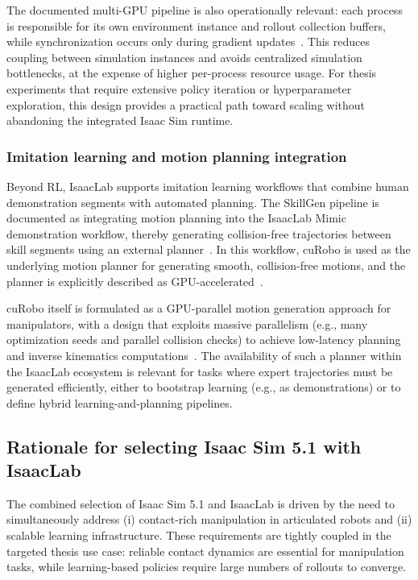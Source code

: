 The documented multi-\ac{GPU} pipeline is also operationally relevant: each process is responsible for its own environment instance and rollout collection buffers, while synchronization occurs only during gradient updates~\cite{isaaclab_multi_gpu_multinode}. This reduces coupling between simulation instances and avoids centralized simulation bottlenecks, at the expense of higher per-process resource usage. For thesis experiments that require extensive policy iteration or hyperparameter exploration, this design provides a practical path toward scaling without abandoning the integrated Isaac Sim runtime.

\subsubsection{Imitation learning and motion planning integration}
Beyond \ac{RL}, IsaacLab supports imitation learning workflows that combine human demonstration segments with automated planning. The SkillGen pipeline is documented as integrating motion planning into the IsaacLab Mimic demonstration workflow, thereby generating collision-free trajectories between skill segments using an external planner~\cite{isaaclab_skillgen}. In this workflow, cuRobo is used as the underlying motion planner for generating smooth, collision-free motions, and the planner is explicitly described as GPU-accelerated~\cite{isaaclab_skillgen}.

cuRobo itself is formulated as a GPU-parallel motion generation approach for manipulators, with a design that exploits massive parallelism (e.g., many optimization seeds and parallel collision checks) to achieve low-latency planning and inverse kinematics computations~\cite{Sundaralingam2023cuRobo}. The availability of such a planner within the IsaacLab ecosystem is relevant for tasks where expert trajectories must be generated efficiently, either to bootstrap learning (e.g., as demonstrations) or to define hybrid learning-and-planning pipelines.

\subsection{Rationale for selecting Isaac Sim 5.1 with IsaacLab}
The combined selection of Isaac Sim 5.1 and IsaacLab is driven by the need to simultaneously address (i) contact-rich manipulation in articulated robots and (ii) scalable learning infrastructure. These requirements are tightly coupled in the targeted thesis use case: reliable contact dynamics are essential for manipulation tasks, while learning-based policies require large numbers of rollouts to converge.

